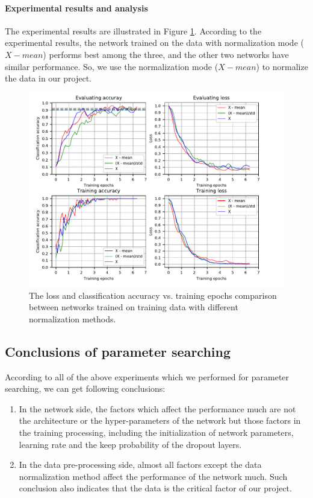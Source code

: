 \paragraph{Experimental results and analysis}
The experimental results are illustrated in Figure \ref{fig:plot_dnm}. According to the experimental results, the network trained on the data with normalization mode (\(X -mean\)) performs best among the three, and the other two networks have similar performance. So, we use the normalization mode (\(X -mean\)) to normalize the data in our project.
\begin{figure}
	\includegraphics[trim=0cm 0cm 0cm 0cm]{fig01/plot_dnm.pdf}
	\caption{The loss and classification accuracy vs. training epochs comparison between networks trained on training data with different normalization methods.}
	\label{fig:plot_dnm}
\end{figure}

\subsection{Conclusions of parameter searching}
According to all of the above experiments which we performed for parameter searching, we can get following conclusions:
\begin{enumerate}
	\item In the network side,  the factors which affect the performance much are not the architecture or the hyper-parameters of the network but those factors in the training processing, including the initialization of network parameters, learning rate and the keep probability of the dropout layers. 
	\item In the data pre-processing side, almost all factors except the data normalization method affect the performance of the network much.  Such conclusion also indicates that the data is the critical factor of our project.   
\end{enumerate}

